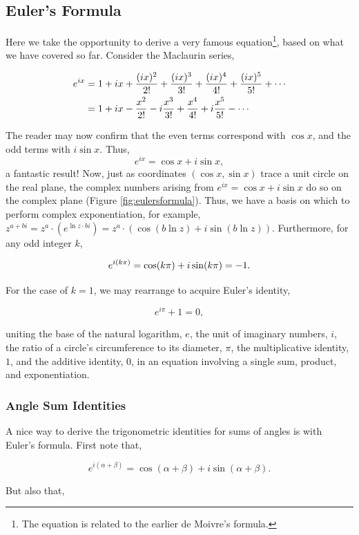 \documentclass[11pt]{amsart}
\begin{document}
\subsection{Euler's Formula}

Here we take the opportunity to derive a very famous equation\footnote{The equation is related to the earlier de Moivre's formula.}, based on what we have covered so far. Consider the Maclaurin series,

\begin{align}
e^{ix} &= 1 + ix + \frac{(ix)^2}{2!} + \frac{(ix)^3}{3!} + \frac{(ix)^4}{4!} + \frac{(ix)^5}{5!} + \cdots \notag \\
&= 1 + ix - \frac{x^2}{2!} - i\frac{x^3}{3!} + \frac{x^4}{4!} + i\frac{x^5}{5!} - \cdots \notag
\end{align}

The reader may now confirm that the even terms correspond with $\cos x$, and the odd terms with $i\sin x$. Thus, $$e^{ix} = \cos x + i\sin x,$$ a fantastic result! Now, just as coordinates $(\cos x, \sin x)$ trace a unit circle on the real plane, the complex numbers arising from $e^{ix} = \cos x + i\sin x$ do so on the complex plane (Figure \ref{fig:eulersformula}). Thus, we have a basis on which to perform complex exponentiation, for example, $z^{a + bi} = z^a \cdot (e^{\ln z\cdot bi}) = z^a \cdot (\cos(b\ln z) + i\sin(b\ln z))$. Furthermore, for any odd integer $k$,

$$
e^{i(k\pi)} = \cos (k\pi) + i\sin (k\pi) \notag = -1.
$$

For the case of $k = 1$, we may rearrange to acquire Euler's identity,

$$
e^{i\pi} + 1 = 0,
$$

uniting the base of the natural logarithm, $e$, the unit of imaginary numbers, $i$, the ratio of a circle's circumference to its diameter, $\pi$, the multiplicative identity, $1$, and the additive identity, $0$, in an equation involving a single sum, product, and exponentiation.

\subsubsection{Angle Sum Identities}

A nice way to derive the trigonometric identities for sums of angles is with Euler's formula. First note that,

$$e^{i(\alpha + \beta)} = \cos (\alpha + \beta) + i\sin (\alpha + \beta).$$

But also that,
\end{document}
